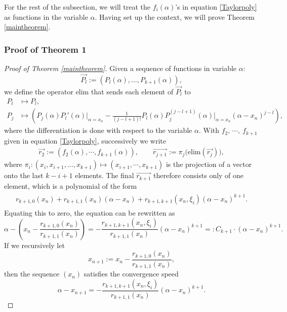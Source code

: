 \documentclass{article}
\begin{document}
 For the rest of the subsection, we will treat the $f_{i}(\alpha)$'s in equation \eqref{Taylorpoly} as functions in the variable $\alpha$. Having set up the context, we will prove Theorem \ref{maintheorem}.

\subsubsection{Proof of Theorem 1}
\begin{proof}[Proof of Theorem \ref{maintheorem}]
Given a sequence of functions in variable $\alpha$:
\[
  \overrightarrow{P_{l}} := (P_{l}(\alpha),\dots,P_{k+1}(\alpha)),
\]
we define the operator $\text{elim}$ that sends each element of $\overrightarrow{P_{l}}$ to 
\begin{align*}
  P_{l} &\longmapsto P_{l},\\
  P_{j} &\longmapsto \left(P_{j}(\alpha)P_{l}'(\alpha)\big|_{\alpha=x_{n}}-\frac{1}{(j-l+1)!}P_{l}(\alpha)P_{j}^{(j-l+1)}(\alpha)\big|_{\alpha=x_{n}}(\alpha-x_{n})^{j-l}\right),
\end{align*}
where the differentiation is done with respect to the variable $\alpha$. With $f_{2},\, \cdots,\ f_{k+1}$ given in equation \eqref{Taylorpoly}, successively we write
\begin{align*}
  \overrightarrow{r_{2}} := (f_{2}(\alpha),\cdots,f_{k+1}(\alpha)),\qquad
  \overrightarrow{r_{j+1}} := \pi_{j}\big(\text{elim}(\overrightarrow{r_{j}})\big),
\end{align*}
where $\pi_{i}:(x_{i},x_{i+1},\dots,x_{k+1})\longmapsto (x_{i+1},\cdots,x_{k+1})$ is the projection of a vector onto the last $k-i+1$ elements. The final  $\overrightarrow{r_{k+1}}$ therefore consists only of one element, which is a polynomial of the form 
\begin{eqnarray}\label{rf-expr}
	\begin{aligned}
  r_{k+1,0}(x_{n})+r_{k+1,1}(x_{n})(\alpha-x_{n})+r_{k+1,k+1}(x_{n},\xi_{i})(\alpha-x_{n})^{k+1}.
  \end{aligned}
\end{eqnarray}
Equating this to zero, the equation can be rewritten as 
\[
  \alpha-\left(x_{n}-\frac{r_{k+1,0}(x_{n})}{r_{k+1,1}(x_{n})}\right) = -\frac{r_{k+1,k+1}(x_{n},\xi_{i})}{r_{k+1,1}(x_{n})}(\alpha-x_{n})^{k+1}=: C_{k+1}\cdot (\alpha-x_{n})^{k+1}.
\]
If we recursively let
\[
  x_{n+1} := x_{n}-\frac{r_{k+1,0}(x_{n})}{r_{k+1,1}(x_{n})},
\]
then the sequence $(x_{n})$ satisfies the convergence speed
\begin{equation}\label{ocr}
  \alpha-x_{n+1}=-\frac{r_{k+1,k+1}(x_{n},\xi_{i})}{r_{k+1,1}(x_{n})}(\alpha-x_{n})^{k+1}.
\end{equation}


\end{proof}
\end{document}
